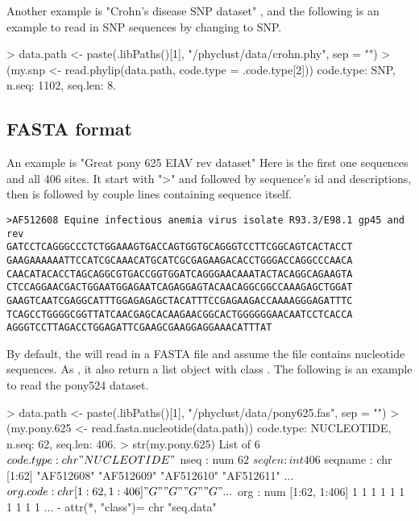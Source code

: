 Another example is "Crohn's disease SNP dataset" \citep{Hugot2001},
and the following is an example to read in SNP sequences by
changing  to SNP.
\begin{Code}
> data.path <- paste(.libPaths()[1], "/phyclust/data/crohn.phy", sep = "")
> (my.snp <- read.phylip(data.path, code.type = .code.type[2]))
code.type: SNP, n.seq: 1102, seq.len: 8.
\end{Code}




\subsection[FASTA format]{FASTA format}
\label{sec:fasta}

An example is "Great pony 625 EIAV rev dataset" \citep{Baccam2003}
Here is the first one sequences and all 406 sites. It start with ">"
and followed by sequence's id and descriptions, then is followed by
couple lines containing sequence itself.
\begin{verbatim}
>AF512608 Equine infectious anemia virus isolate R93.3/E98.1 gp45 and rev
GATCCTCAGGGCCCTCTGGAAAGTGACCAGTGGTGCAGGGTCCTTCGGCAGTCACTACCT
GAAGAAAAAATTCCATCGCAAACATGCATCGCGAGAAGACACCTGGGACCAGGCCCAACA
CAACATACACCTAGCAGGCGTGACCGGTGGATCAGGGAACAAATACTACAGGCAGAAGTA
CTCCAGGAACGACTGGAATGGAGAATCAGAGGAGTACAACAGGCGGCCAAAGAGCTGGAT
GAAGTCAATCGAGGCATTTGGAGAGAGCTACATTTCCGAGAAGACCAAAAGGGAGATTTC
TCAGCCTGGGGCGGTTATCAACGAGCACAAGAACGGCACTGGGGGGAACAATCCTCACCA
AGGGTCCTTAGACCTGGAGATTCGAAGCGAAGGAGGAAACATTTAT
\end{verbatim}

By default, the  will read in a FASTA file and
assume the file contains nucleotide sequences. As ,
it also return a list object with class .
The following is an example to read the pony524 dataset.
\begin{Code}
> data.path <- paste(.libPaths()[1], "/phyclust/data/pony625.fas", sep = "")
> (my.pony.625 <- read.fasta.nucleotide(data.path))
code.type: NUCLEOTIDE, n.seq: 62, seq.len: 406.
> str(my.pony.625)
List of 6
 $ code.type: chr "NUCLEOTIDE"
 $ nseq     : num 62
 $ seqlen   : int 406
 $ seqname  : chr [1:62] "AF512608" "AF512609" "AF512610" "AF512611" ...
 $ org.code : chr [1:62, 1:406] "G" "G" "G" "G" ...
 $ org      : num [1:62, 1:406] 1 1 1 1 1 1 1 1 1 1 ...
 - attr(*, "class")= chr "seq.data"
\end{Code}




